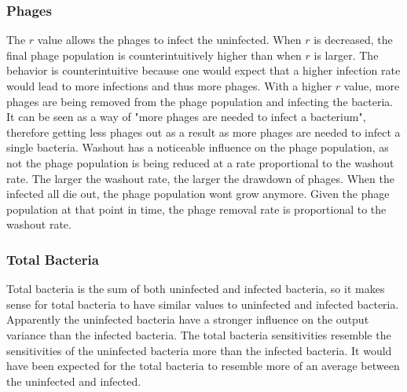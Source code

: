 \subsubsection{Phages}
The $r$ value allows the phages to infect the uninfected. 
When $r$ is decreased, the final phage population is counterintuitively higher than when $r$ is larger. 
The behavior is counterintuitive because one would expect that a higher infection rate would lead to more infections and thus more phages. 
With a higher $r$ value, more phages are being removed from the phage population and infecting the bacteria. 
It can be seen as a way of "more phages are needed to infect a bacterium", therefore getting less phages out as a result as more phages are needed to infect a single bacteria. 
Washout has a noticeable influence on the phage population, as not the phage population is being reduced at a rate proportional to the washout rate. 
The larger the washout rate, the larger the drawdown of phages. 
When the infected all die out, the phage population wont grow anymore. 
Given the phage population at that point in time, the phage removal rate is proportional to the washout rate. 

\subsubsection{Total Bacteria}
Total bacteria is the sum of both uninfected and infected bacteria, so it makes sense for total bacteria to have similar values to uninfected and infected bacteria. 
Apparently the uninfected bacteria have a stronger influence on the output variance than the infected bacteria. 
The total bacteria sensitivities resemble the sensitivities of the uninfected bacteria more than the infected bacteria. 
It would have been expected for the total bacteria to resemble more of an average between the uninfected and infected. 


